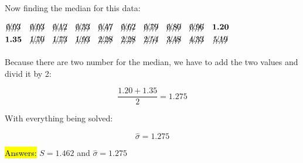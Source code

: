 \documentclass{article}
\begin{document}
\vspace{2mm}

Now finding the median for this data: 
\vspace{2mm}

$\begin{matrix}
\xout{0.03} & \xout{0.03} & \xout{0.12} & \xout{0.33} & \xout{0.47 }  & \xout{0.62} & \xout{0.79} & \xout{0.80} & \xout{0.96 } & \textbf{1.20} \\
\textbf{1.35} & \xout{1.70} & \xout{1.73} & \xout{1.93} & \xout{2.28} &  \xout{2.28} & \xout{2.54} & \xout{3.48} & \xout{4.33} & \xout{5.19} 
\end{matrix}$
\vspace{2mm}


Because there are two number for the median, we have to add the two values and divid it by 2:

$$\frac{1.20 + 1.35} {2}=1.275$$

With everything being solved:

$$\hat{\sigma}=1.275$$

\begin{center}
\hl{Answers:} $S=1.462$ and $\hat{\sigma}=1.275$
\end{center}




  
\end{document}
